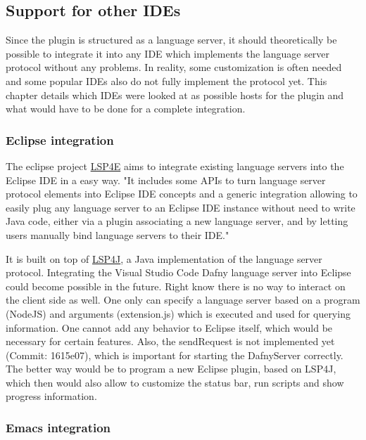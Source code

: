 \subsection{Support for other IDEs} \label{ides}
Since the plugin is structured as a language server, it should theoretically be possible to integrate it into any IDE which implements the language server protocol without any problems. In reality, some customization is often needed and some popular IDEs also do not fully implement the protocol yet. This chapter details which IDEs were looked at as possible hosts for the plugin and what would have to be done for a complete integration.

\subsubsection{Eclipse integration}
The eclipse project \href{https://projects.eclipse.org/projects/technology.lsp4e}{LSP4E} aims to integrate existing language servers into the Eclipse IDE in a easy way. 
\newline
"It includes some APIs to turn language server protocol elements into Eclipse IDE concepts and a generic integration allowing to easily plug any language server to an Eclipse IDE instance without need to write Java code, either via a plugin associating a new language server, and by letting users manually bind language servers to their IDE." \cite{lsp4e}

It is built on top of \href{https://github.com/eclipse/lsp4j}{LSP4J}, a Java implementation of the language server protocol. 
\newline
Integrating the Visual Studio Code Dafny language server into Eclipse could become possible in the future. Right know there is no way to interact on the client side as well. One only can specify a language server based on a program (NodeJS) and arguments (extension.js) which is executed and used for querying information. One cannot add any behavior to Eclipse itself, which would be necessary for certain features. Also, the sendRequest is not implemented yet (Commit: 1615e07), which is important for starting the DafnyServer correctly. 
The better way would be to program a new Eclipse plugin, based on LSP4J, which then would also allow to customize the status bar, run scripts and show progress information. 


\subsubsection{Emacs integration}

